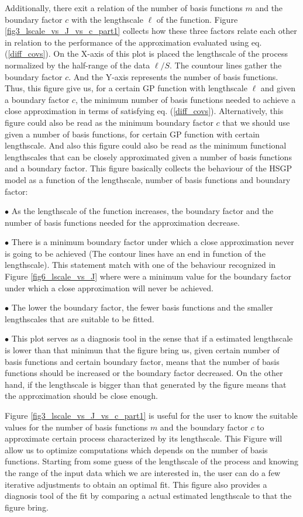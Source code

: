 \documentclass[]{interact}
\theoremstyle{plain}%
\theoremstyle{definition}
\theoremstyle{remark}
\begin{document}
Additionally, there exit a relation of the number of basis functions $m$ and the boundary factor $c$ with the lengthscale $\ell$ of the function. Figure \ref{fig3_lscale_vs_J_vs_c_part1} collects how these three factors relate each other in relation to the performance of the approximation evaluated using eq. (\ref{diff_covs}). On the X-axis of this plot is placed the lengthscale of the process normalized by the half-range of the data $\ell/S$. The countour lines gather the boundary factor $c$. And the Y-axis represents the number of basis functions. Thus, this figure give us, for a certain GP function with lengthscale $\ell$ and given a boundary factor $c$, the minimum number of basis functions needed to achieve a close approximation in terms of satisfying eq. (\ref{diff_covs}). Alternatively, this figure could also be read as the minimum boundary factor $c$ that we should use given a number of basis functions, for certain GP function with certain lengthscale. And also this figure could also be read as the minimum functional lengthscales that can be closely approximated given a number of basis functions and a boundary factor. This figure basically collects the behaviour of the HSGP model as a function of the lengthscale, number of basis functions and boundary factor:

$\bullet$ As the lengthscale of the function increases, the boundary factor and the number of basis functions needed for the approximation decrease.

$\bullet$ There is a minimum boundary factor under which a close approximation never is going to be achieved (The contour lines have an end in function of the lengthscale). This statement match with one of the behaviour recognized in Figure \ref{fig6_lscale_vs_J} where were a minimum value for the boundary factor under which a close approximation will never be achieved.

$\bullet$ The lower the boundary factor, the fewer basis functions and the smaller lengthscales that are suitable to be fitted. 

$\bullet$ This plot serves as a diagnosis tool in the sense that if a estimated lengthscale is lower than that minimun that the figure bring us, given certain number of basis functions and certain boundary factor, means that the number of basis functions should be increased or the boundary factor decreased. On the other hand, if the lengthscale is bigger than that generated by the figure means that the approximation should be close enough.

Figure \ref{fig3_lscale_vs_J_vs_c_part1} is useful for the user to know the suitable values for the number of basis functions $m$ and the boundary factor $c$ to approximate certain process characterized by its lengthscale. This Figure will allow us to optimize computations which depends on the number of basis functions. Starting from some guess of the lengthscale of the process and knowing the range of the input data which we are interested in, the user can do a few iterative adjustments to obtain an optimal fit. This figure also provides a diagnosis tool of the fit by comparing a actual estimated lengthscale to that the figure bring. 
\end{document}
